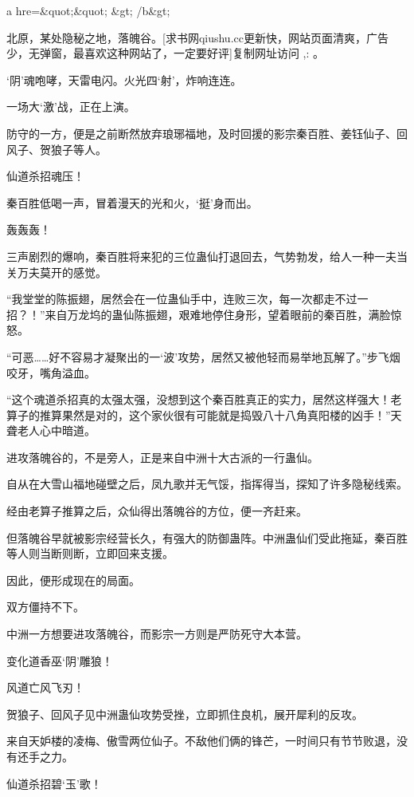 
\begin{this_body}

a hre=\&quot;\&quot;  \&gt; /b\&gt;

北原，某处隐秘之地，落魄谷。[求书网qiushu.cc更新快，网站页面清爽，广告少，无弹窗，最喜欢这种网站了，一定要好评]复制网址访问 ,: 。

‘阴’魂咆哮，天雷电闪。火光四‘射’，炸响连连。

一场大‘激’战，正在上演。

防守的一方，便是之前断然放弃琅琊福地，及时回援的影宗秦百胜、姜钰仙子、回风子、贺狼子等人。

仙道杀招魂压！

秦百胜低喝一声，冒着漫天的光和火，‘挺’身而出。

轰轰轰！

三声剧烈的爆响，秦百胜将来犯的三位蛊仙打退回去，气势勃发，给人一种一夫当关万夫莫开的感觉。

“我堂堂的陈振翅，居然会在一位蛊仙手中，连败三次，每一次都走不过一招？！”来自万龙坞的蛊仙陈振翅，艰难地停住身形，望着眼前的秦百胜，满脸惊怒。

“可恶……好不容易才凝聚出的一‘波’攻势，居然又被他轻而易举地瓦解了。”步飞烟咬牙，嘴角溢血。

“这个魂道杀招真的太强太强，没想到这个秦百胜真正的实力，居然这样强大！老算子的推算果然是对的，这个家伙很有可能就是捣毁八十八角真阳楼的凶手！”天聋老人心中暗道。

进攻落魄谷的，不是旁人，正是来自中洲十大古派的一行蛊仙。

自从在大雪山福地碰壁之后，凤九歌并无气馁，指挥得当，探知了许多隐秘线索。

经由老算子推算之后，众仙得出落魄谷的方位，便一齐赶来。

但落魄谷早就被影宗经营长久，有强大的防御蛊阵。中洲蛊仙们受此拖延，秦百胜等人则当断则断，立即回来支援。

因此，便形成现在的局面。

双方僵持不下。

中洲一方想要进攻落魄谷，而影宗一方则是严防死守大本营。

变化道香巫‘阴’雕狼！

风道亡风飞刃！

贺狼子、回风子见中洲蛊仙攻势受挫，立即抓住良机，展开犀利的反攻。

来自天妒楼的凌梅、傲雪两位仙子。不敌他们俩的锋芒，一时间只有节节败退，没有还手之力。

仙道杀招碧‘玉’歌！


\end{this_body}
